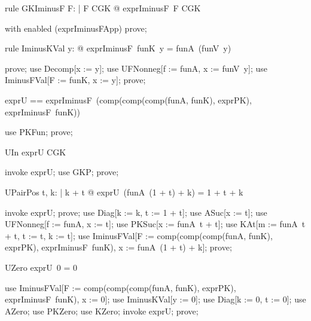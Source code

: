 \documentclass{article}
\begin{document}
\begin{theorem}{rule GKIminusF}
  \forall F: \nat \fun \nat | F \in CGK @ exprIminusF~F \in CGK
\end{theorem}

\begin{zproof}
with enabled (exprIminusFApp) prove;
\end{zproof}

\begin{theorem}{rule IminusKVal}
  \forall y: \nat @ exprIminusF~funK~y = funA~(funV~y)
\end{theorem}

\begin{zproof}
prove;
use Decomp[x := y];
use UFNonneg[f := funA, x := funV~y];
use IminusFVal[F := funK, x := y];
prove;
\end{zproof}

\begin{zed}
  exprU == exprIminusF~(comp(comp(comp(funA, funK), exprPK), exprIminusF~funK))
\end{zed}

\begin{zproof}
use PKFun;
prove;
\end{zproof}

\begin{theorem}{UIn}
  exprU \in CGK
\end{theorem}

\begin{zproof}
invoke exprU;
use GKP;
prove;
\end{zproof}

\begin{theorem}{UPairPos}
  \forall t, k: \nat | k  + t @ exprU~(funA~(1 + t) + k) = 1 + t + k
\end{theorem}

\begin{zproof}
invoke exprU;
prove;
use Diag[k := k, t := 1 + t];
use ASuc[x := t];
use UFNonneg[f := funA, x := t];
use PKSuc[x := funA~t + t];
use KAt[m := funA~t + t, t := t, k := t];
use IminusFVal[F := comp(comp(comp(funA, funK), exprPK), exprIminusF~funK), x := funA~(1 + t) + k];
prove;
\end{zproof}

\begin{theorem}{UZero}
  exprU~0 = 0
\end{theorem}

\begin{zproof}
use IminusFVal[F := comp(comp(comp(funA, funK), exprPK), exprIminusF~funK), x := 0];
use IminusKVal[y := 0];
use Diag[k := 0, t := 0];
use AZero;
use PKZero;
use KZero;
invoke exprU;
prove;
\end{zproof}
\end{document}
